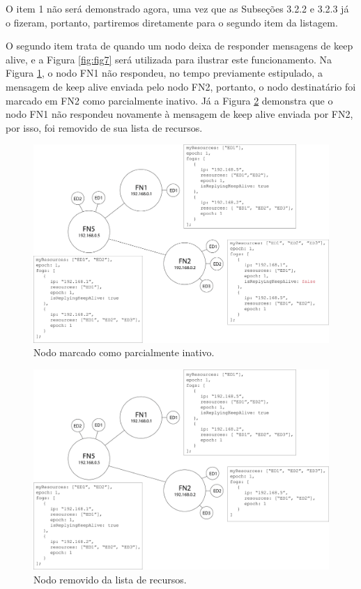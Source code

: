 O item 1 não será demonstrado agora, uma vez que as Subseções 3.2.2 e 3.2.3 já o fizeram, portanto, partiremos diretamente para o segundo item da listagem.

O segundo item trata de quando um nodo deixa de responder mensagens de keep alive, e a Figura \ref{fig:fig7} será utilizada para ilustrar este funcionamento.
Na Figura \ref{fig:fig8}, o nodo FN1 não respondeu, no tempo previamente estipulado, a mensagem de keep alive enviada pelo nodo FN2, 
portanto, o nodo destinatário foi marcado em FN2 como parcialmente inativo.
Já a Figura \ref{fig:fig9} demonstra que o nodo FN1 não respondeu novamente à mensagem de keep alive enviada por FN2, por isso, foi removido de sua lista de recursos. 


\begin{figure}[htb!]
    \centering\includegraphics[width=.8\textwidth]{fig8.png}
    \caption%
    {\label{fig:fig8} Nodo marcado como parcialmente inativo.}
\end{figure}

\begin{figure}[htb!]
    \centering\includegraphics[width=.8\textwidth]{fig9.png}
    \caption%
    {\label{fig:fig9} Nodo removido da lista de recursos.}
\end{figure}

